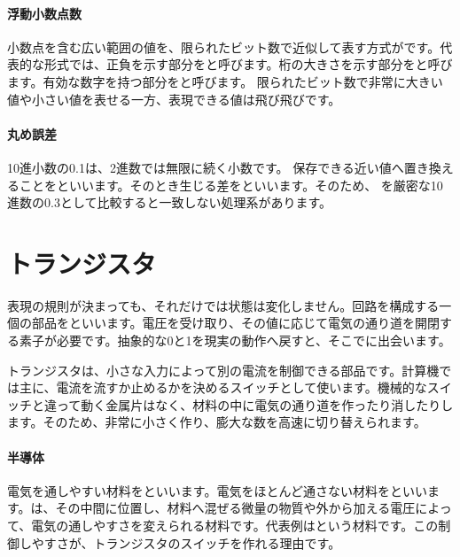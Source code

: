 \par
\endgroup
\medskip
\begingroup
\paragraph{浮動小数点数}
        小数点を含む広い範囲の値を、限られたビット数で近似して表す方式がです。代表的な形式では、正負を示す部分をと呼びます。桁の大きさを示す部分をと呼びます。有効な数字を持つ部分をと呼びます。
        限られたビット数で非常に大きい値や小さい値を表せる一方、表現できる値は飛び飛びです。

\paragraph{丸め誤差}
        10進小数の0.1は、2進数では無限に続く小数です。
        保存できる近い値へ置き換えることをといいます。そのとき生じる差をといいます。そのため、 を厳密な10進数の0.3として比較すると一致しない処理系があります。

\par
\endgroup
\par
\endgroup


\section{トランジスタ}
\label{sec:01-digital-computer-05}

表現の規則が決まっても、それだけでは状態は変化しません。回路を構成する一個の部品をといいます。電圧を受け取り、その値に応じて電気の通り道を開閉する素子が必要です。抽象的な0と1を現実の動作へ戻すと、そこでに出会います。

トランジスタは、小さな入力によって別の電流を制御できる部品です。計算機では主に、電流を流すか止めるかを決めるスイッチとして使います。機械的なスイッチと違って動く金属片はなく、材料の中に電気の通り道を作ったり消したりします。そのため、非常に小さく作り、膨大な数を高速に切り替えられます。

\begingroup
\begingroup
\paragraph{半導体}
        電気を通しやすい材料をといいます。電気をほとんど通さない材料をといいます。は、その中間に位置し、材料へ混ぜる微量の物質や外から加える電圧によって、電気の通しやすさを変えられる材料です。代表例はという材料です。この制御しやすさが、トランジスタのスイッチを作れる理由です。

